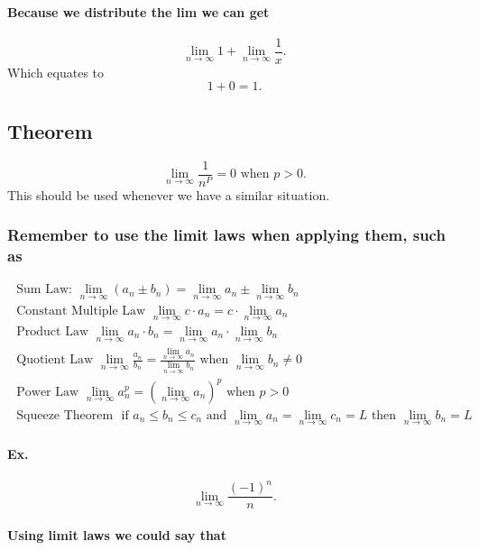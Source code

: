 \paragraph{Because we distribute the lim we can get}

\[
\lim_{n \to \infty} 1 + \lim_{n \to \infty} \frac{1}{x}
.\] 
Which equates to 
\[
1+0=1
.\] 

\subsection{Theorem}%
\label{sub:Theorem}
\[
\lim_{n \to \infty} \frac{1}{n^{P}}=0 \text{ when }p>0
.\] 
This should be used whenever we have a similar situation. 

\subsubsection{Remember to use the limit laws when applying them, such as}

\begin{gather*}
\text{ Sum Law: } \lim_{n \to \infty} \left( a_n \pm b_n \right) = \lim_{n \to \infty} a_n \pm \lim_{n \to \infty} b_n\\
\text{ Constant Multiple Law } \lim_{n \to \infty} c\cdot a_n = c\cdot \lim_{n \to \infty} a_n\\
\text{ Product Law } \lim_{n \to \infty} a_n\cdot b_n = \lim_{n \to \infty} a_n \cdot \lim_{n \to \infty} b_n\\
\text{ Quotient Law } \lim_{n \to \infty} \frac{a_n}{b_n} = \frac{\lim_{n \to \infty} a_n}{\lim_{n \to \infty} b_n} \text{ when } \lim_{n \to \infty} b_n \neq 0\\
\text{ Power Law } \lim_{n \to \infty} a_n^{p} = \left( \lim_{n \to \infty} a_n \right) ^{p} \text{ when } p>0\\
\text{ Squeeze Theorem } \text{ if } a_n \leq b_n \leq c_n \text{ and } \lim_{n \to \infty} a_n = \lim_{n \to \infty} c_n = L \text{ then } \lim_{n \to \infty} b_n = L
\end{gather*}
\newpage
\paragraph{Ex.}
\[
\lim_{n \to \infty} \frac{\left( -1 \right) ^{n}}{n}
.\] 

\paragraph{Using limit laws we could say that }

